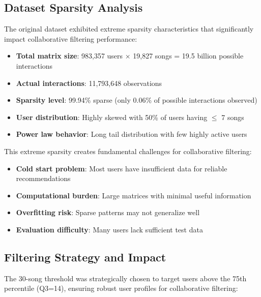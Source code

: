 \documentclass[12pt,a4paper]{article}
\begin{document}
\subsection{Dataset Sparsity Analysis}

The original dataset exhibited extreme sparsity characteristics that significantly impact collaborative filtering performance:

\begin{itemize}
    \item \textbf{Total matrix size}: 983,357 users × 19,827 songs = 19.5 billion possible interactions
    \item \textbf{Actual interactions}: 11,793,648 observations
    \item \textbf{Sparsity level}: 99.94\% sparse (only 0.06\% of possible interactions observed)
    \item \textbf{User distribution}: Highly skewed with 50\% of users having $\leq$ 7 songs
    \item \textbf{Power law behavior}: Long tail distribution with few highly active users
\end{itemize}

This extreme sparsity creates fundamental challenges for collaborative filtering:
\begin{itemize}
    \item \textbf{Cold start problem}: Most users have insufficient data for reliable recommendations
    \item \textbf{Computational burden}: Large matrices with minimal useful information
    \item \textbf{Overfitting risk}: Sparse patterns may not generalize well
    \item \textbf{Evaluation difficulty}: Many users lack sufficient test data
\end{itemize}

\subsection{Filtering Strategy and Impact}

The 30-song threshold was strategically chosen to target users above the 75th percentile (Q3=14), ensuring robust user profiles for collaborative filtering:
\end{document}
